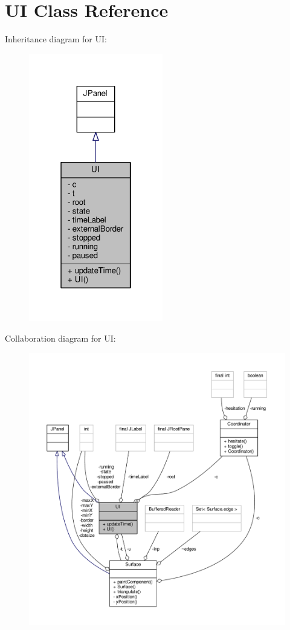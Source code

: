 \hypertarget{classUI}{\section{U\-I Class Reference}
\label{classUI}
}


Inheritance diagram for U\-I\-:
\nopagebreak
\begin{figure}[H]
\begin{center}
\leavevmode
\includegraphics[width=166pt]{classUI__inherit__graph}
\end{center}
\end{figure}


Collaboration diagram for U\-I\-:
\nopagebreak
\begin{figure}[H]
\begin{center}
\leavevmode
\includegraphics[width=350pt]{classUI__coll__graph}
\end{center}
\end{figure}
